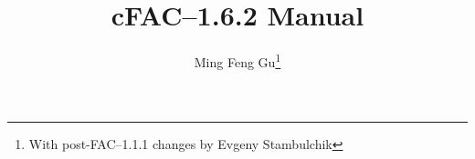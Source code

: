 \documentclass[twoside,a4paper]{refrep}
\newcommand{\cFAC}{{cFAC}\xspace}
\newcommand{\facversion}{{1.6.2}\xspace}
\newcounter{faq}[section]
\begin{document}
\title{\cFAC--\facversion Manual}
\author{Ming Feng Gu\thanks{With post-FAC--1.1.1 changes by Evgeny Stambulchik}}

\date{}

\maketitle

\tableofcontents















\printindex


\end{document}
